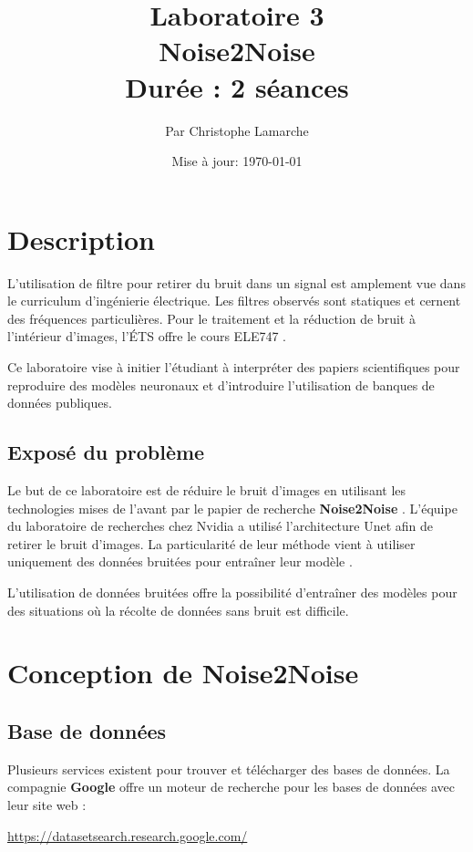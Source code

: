 \documentclass{article}
\title{Laboratoire 3\\
  \large Noise2Noise\\
  \normalsize Durée : 2 séances}
\author{Par Christophe Lamarche}
\date{Mise à jour: \today}
\begin{document}
\maketitle

\section{Description}
L'utilisation de filtre pour retirer du bruit dans un signal est amplement vue dans le curriculum d'ingénierie électrique. Les filtres observés sont statiques et cernent des fréquences particulières. Pour le traitement et la réduction de bruit à l'intérieur d'images, l'ÉTS offre le cours ELE747 \citep{ELE747}.

\bigbreak
Ce laboratoire vise à initier l'étudiant à interpréter des papiers scientifiques pour reproduire des modèles neuronaux et d'introduire l'utilisation de banques de données publiques.

\subsection{Exposé du problème}
Le but de ce laboratoire est de réduire le bruit d'images en utilisant les technologies mises de l'avant par le papier de recherche \textbf{Noise2Noise} \citep{Noise2Noise}. L'équipe du laboratoire de recherches chez Nvidia a utilisé l'architecture Unet \citep{Unet} afin de retirer le bruit d'images. La particularité de leur méthode vient à utiliser uniquement des données bruitées pour entraîner leur modèle \citep{Noise2Noise}.

\bigbreak
L'utilisation de données bruitées offre la possibilité d’entraîner des modèles pour des situations où la récolte de données sans bruit est difficile.

\section{Conception de Noise2Noise}
\subsection{Base de données}
Plusieurs services existent pour trouver et télécharger des bases de données. La compagnie \textbf{Google} offre un moteur de recherche pour les bases de données avec leur site web :
\smallbreak
\begin{center}
  \href{https://datasetsearch.research.google.com/}{https://datasetsearch.research.google.com/}
\end{center}
\end{document}
